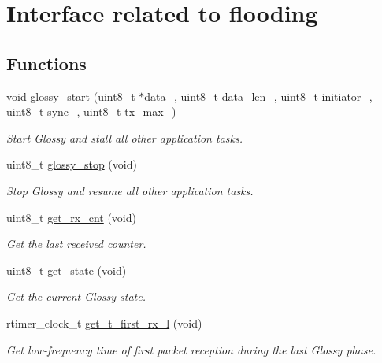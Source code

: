 \hypertarget{group__glossy__main}{
\section{Interface related to flooding}
\label{group__glossy__main}
}
\subsection*{Functions}
\begin{DoxyCompactItemize}
\item 
void \hyperlink{group__glossy__main_ga3b8821abe2625c08305cba82200bf67b}{glossy\_\-start} (uint8\_\-t $\ast$data\_\-, uint8\_\-t data\_\-len\_\-, uint8\_\-t initiator\_\-, uint8\_\-t sync\_\-, uint8\_\-t tx\_\-max\_\-)
\begin{DoxyCompactList}\small\item\em Start Glossy and stall all other application tasks. \end{DoxyCompactList}\item 
uint8\_\-t \hyperlink{group__glossy__main_ga708d908317af37345a810942271bda8c}{glossy\_\-stop} (void)
\begin{DoxyCompactList}\small\item\em Stop Glossy and resume all other application tasks. \end{DoxyCompactList}\item 
uint8\_\-t \hyperlink{group__glossy__main_gab2e2126a4762a97c6396ce51221eaea7}{get\_\-rx\_\-cnt} (void)
\begin{DoxyCompactList}\small\item\em Get the last received counter. \end{DoxyCompactList}\item 
uint8\_\-t \hyperlink{group__glossy__main_ga16ddcf3313115b5697723299590ca8f5}{get\_\-state} (void)
\begin{DoxyCompactList}\small\item\em Get the current Glossy state. \end{DoxyCompactList}\item 
rtimer\_\-clock\_\-t \hyperlink{group__glossy__main_ga88daf788efaacdc2705c58a822d97129}{get\_\-t\_\-first\_\-rx\_\-l} (void)
\begin{DoxyCompactList}\small\item\em Get low-\/frequency time of first packet reception during the last Glossy phase. \end{DoxyCompactList}\end{DoxyCompactItemize}


